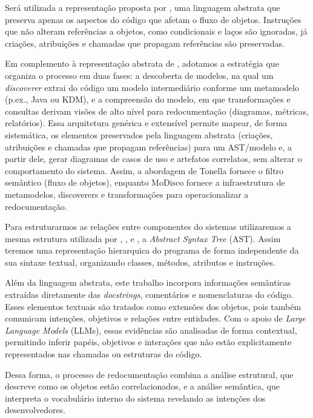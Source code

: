\documentclass[12pt,a4paper]{article}
\begin{document}
Será utilizada a representação proposta por \textcite{tonella2007reverse}, uma linguagem abstrata que preserva apenas os aspectos do código que afetam o fluxo de objetos. Instruções que não alteram referências a objetos, como condicionais e laços são ignoradas, já criações, atribuições e chamadas que propagam referências são preservadas. 

Em complemento à representação abstrata de \textcite{tonella2007reverse}, adotamos a estratégia  que organiza o processo em duas fases: a descoberta de modelos, na qual um \textit{discoverer} extrai do código um modelo intermediário conforme um metamodelo (p.ex., Java ou KDM), e a compreensão do modelo, em que transformações e consultas derivam visões de alto nível para redocumentação (diagramas, métricas, relatórios). Essa arquitetura genérica e extensível permite mapear, de forma sistemática, os elementos preservados pela linguagem abstrata (criações, atribuições e chamadas que propagam referências) para um AST/modelo e, a partir dele, gerar diagramas de casos de uso e artefatos correlatos, sem alterar o comportamento do sistema. Assim, a abordagem de Tonella fornece o filtro semântico (fluxo de objetos), enquanto MoDisco fornece a infraestrutura de metamodelos, discoverers e transformações para operacionalizar a redocumentação.

Para estruturarmos as relações entre componentes do sistemas utilizaremos a mesma estrutura utilizada por \textcite{tonella2007reverse}, \textcite{pereira2011recovering}, \textcite{Wang2006AST} e \textcite{Fauzi2016AST}, a \textit{Abstract Syntax Tree} (AST). Assim teremos uma representação hierarquica do programa de forma independente da sua sintaxe textual, organizando classes, métodos, atributos e instruções.

Além da linguagem abstrata, este trabalho incorpora informações semânticas extraídas diretamente das \textit{docstrings}, comentários e nomenclaturas do código. Esses elementos textuais são tratados como extensões dos objetos, pois também comunicam intenções, objetivos e relações entre entidades. Com o apoio de \textit{Large Language Models} (LLMs), essas evidências são analisadas de forma contextual, permitindo inferir papéis, objetivos e interações que não estão explicitamente representados nas chamadas ou estruturas do código.

Dessa forma, o processo de redocumentação combina a análise estrutural, que descreve como os objetos estão correlacionados, e a análise semântica, que interpreta o vocabulário interno do sistema revelando as intenções dos desenvolvedores. 
\end{document}
